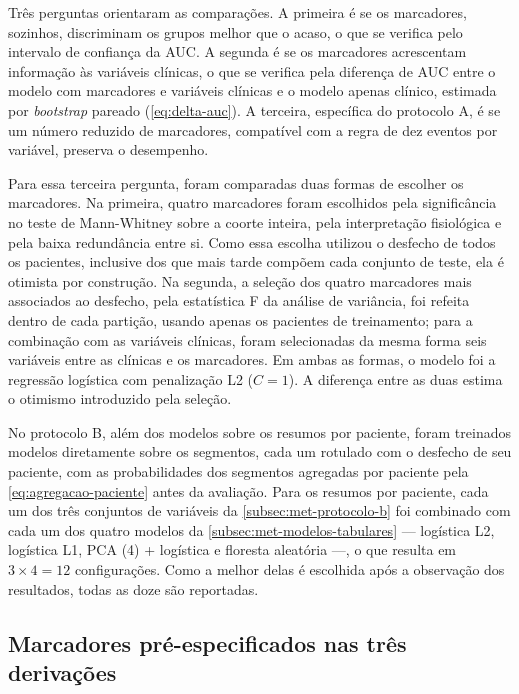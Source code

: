 Três perguntas orientaram as comparações. A primeira é se os marcadores,
sozinhos, discriminam os grupos melhor que o acaso, o que se verifica pelo
intervalo de confiança da \gls{AUC}. A segunda é se os marcadores
acrescentam informação às variáveis clínicas, o que se verifica pela
diferença de \gls{AUC} entre o modelo com marcadores e variáveis clínicas e
o modelo apenas clínico, estimada por \textit{bootstrap} pareado
(\autoref{eq:delta-auc}). A terceira, específica do protocolo A, é se um
número reduzido de marcadores, compatível com a regra de dez eventos por
variável, preserva o desempenho.

Para essa terceira pergunta, foram comparadas duas formas de escolher os
marcadores. Na primeira, quatro marcadores foram escolhidos pela
significância no teste de Mann-Whitney sobre a coorte inteira, pela
interpretação fisiológica e pela baixa redundância entre si. Como essa
escolha utilizou o desfecho de todos os pacientes, inclusive dos que mais
tarde compõem cada conjunto de teste, ela é otimista por construção. Na
segunda, a seleção dos quatro marcadores mais associados ao desfecho, pela
estatística F da análise de variância, foi refeita dentro de cada partição,
usando apenas os pacientes de treinamento; para a combinação com as
variáveis clínicas, foram selecionadas da mesma forma seis variáveis entre
as clínicas e os marcadores. Em ambas as formas, o modelo foi a regressão
logística com penalização L2 ($C = 1$).
A diferença entre as duas estima o otimismo introduzido pela seleção.

No protocolo B, além dos modelos sobre os resumos por paciente, foram
treinados modelos diretamente sobre os segmentos, cada um rotulado com o
desfecho de seu paciente, com as probabilidades dos segmentos agregadas por
paciente pela \autoref{eq:agregacao-paciente} antes da avaliação. Para os
resumos por paciente, cada um dos três conjuntos de variáveis da
\autoref{subsec:met-protocolo-b} foi combinado com cada um dos quatro
modelos da \autoref{subsec:met-modelos-tabulares} --- logística L2,
logística L1, \gls{PCA} (4) + logística e floresta aleatória ---, o que
resulta em $3 \times 4 = 12$ configurações. Como a melhor delas é escolhida após a
observação dos resultados, todas as doze são reportadas.

\subsection{Marcadores pré-especificados nas três derivações}
\label{subsec:met-pre-especificados}

